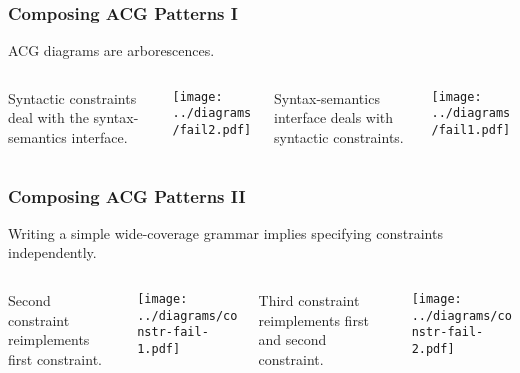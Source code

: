 \documentclass{beamer}
\begin{document}
\begin{frame}
  \frametitle{Composing ACG Patterns I}

  ACG diagrams are arborescences.

  \begin{columns}[c]
    \begin{column}{0.25\textwidth}
      {\small Syntactic constraints deal with the syntax-semantics
        interface.}

    \end{column}
    \begin{column}{0.25\textwidth}
      \begin{center}
        \texttt{[image: ../diagrams/fail2.pdf]}
      \end{center}
    \end{column}
    \begin{column}{0.25\textwidth}
      {\small Syntax-semantics interface deals with syntactic
        constraints.}

    \end{column}
    \begin{column}{0.25\textwidth}
      \begin{center}
        \texttt{[image: ../diagrams/fail1.pdf]}
      \end{center}
    \end{column}
  \end{columns}
\end{frame}


\begin{frame}
  \frametitle{Composing ACG Patterns II}

  Writing a simple wide-coverage grammar implies specifying constraints
  independently.

  \begin{columns}[c]
    \begin{column}{0.25\textwidth}
      Second constraint reimplements first constraint.

    \end{column}
    \begin{column}{0.25\textwidth}
      \begin{center}
        \texttt{[image: ../diagrams/constr-fail-1.pdf]}
      \end{center}
    \end{column}
    \begin{column}{0.25\textwidth}
      Third constraint reimplements first and second constraint.

    \end{column}
    \begin{column}{0.25\textwidth}
      \begin{center}
        \texttt{[image: ../diagrams/constr-fail-2.pdf]}
      \end{center}
    \end{column}
  \end{columns}
\end{frame}
\end{document}
